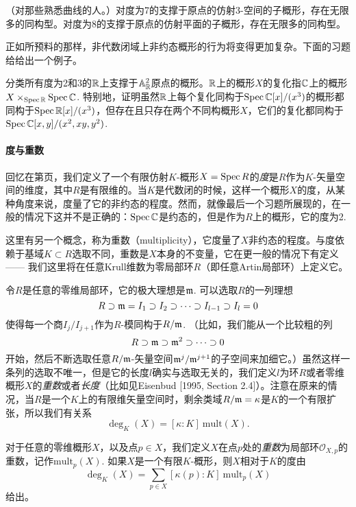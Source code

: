 \begin{exe}
	（对那些熟悉曲线的人。）对度为7的支撑于原点的仿射$3$\hyp 空间的子概形，存在无限多的同构型。对度为8的支撑于原点的仿射平面的子概形，存在无限多的同构型。
\end{exe}

正如所预料的那样，非代数闭域上非约态概形的行为将变得更加复杂。下面的习题给给出一个例子。

\begin{exe}
	分类所有度为2和3的$\mathbb{R}$上支撑于$\mathbb{A}_{\mathbb{R}}^2$原点的概形。$\mathbb{R}$上的概形$X$的复化指$\mathbb{C}$上的概形$X\times_{\operatorname{Spec} \mathbb{R}}\operatorname{Spec} \mathbb{C}$. 特别地，证明虽然$\mathbb{R}$上每个复化同构于$\operatorname{Spec} \mathbb{C}[x]/(x^3)$的概形都同构于$\operatorname{Spec} \mathbb{R}[x]/(x^3)$，但存在且只存在两个不同构概形$X$，它们的复化都同构于$\operatorname{Spec} \mathbb{C}[x,y]/(x^2,xy,y^2)$.
\end{exe}

\paragraph*{度与重数}
回忆在第\pageref{deg}页，我们定义了一个有限仿射$K$\hyp 概形$X=\operatorname{Spec} R$的\textit{度}是$R$作为$K$\hyp 矢量空间的维度，其中$R$是有限维的。当$K$是代数闭的时候，这样一个概形$X$的度，从某种角度来说，度量了它的非约态的程度。然而，就像最后一个习题所展现的，在一般的情况下这并不是正确的：$\operatorname{Spec} \mathbb{C}$是约态的，但是作为$R$上的概形，它的度为2.

这里有另一个概念，称为重数（multiplicity），它度量了$X$非约态的程度。与度依赖于基域$K\subset R$选取不同，重数是$X$本身的不变量，它在更一般的情况下有定义 ------ 我们这里将在任意Krull维数为零局部环$R$（即任意Artin局部环）上定义它。

令$R$是任意的零维局部环，它的极大理想是$\mathfrak{m}$. 可以选取$R$的一列理想
\[
	R\supset \mathfrak{m} = I_1\supset I_2\supset \cdots \supset I_{l-1}\supset I_l=0
\]
使得每一个商$I_j/I_{j+1}$作为$R$\hyp 模同构于$R/\mathfrak{m}$. （比如，我们能从一个比较粗的列
\[
	R\supset \mathfrak{m} \supset \mathfrak{m}^2\supset \cdots \supset 0
\]
开始，然后不断选取任意$R/\mathfrak{m}$\hyp 矢量空间$\mathfrak{m}^j/\mathfrak{m}^{j+1}$的子空间来加细它。）虽然这样一条列的选取不唯一，但是它的长度$l$确实与选取无关的，我们定义$l$为环$R$或者零维概形$X$的\textit{重数}或者\textit{长度}（比如见Eisenbud [1995, Section 2.4]）。注意在原来的情况，当$R$是一个$K$上的有限维矢量空间时，剩余类域$R/\mathfrak{m}=\kappa$是$K$的一个有限扩张，所以我们有关系
\[
	\deg_K(X)=[\kappa:K]~\mathrm{mult}(X).
\]

对于任意的零维概形$X$，以及点$p\in X$，我们定义$X$在点$p$处的\textit{重数}为局部环$\mathscr{O}_{X,p}$的重数，记作$\mathrm{mult}_p(X)$. 如果$X$是一个有限$K$\hyp 概形，则$X$相对于$K$的度由
\[
	\deg_K(X)=\sum_{p\in X}[\kappa(p):K]~\mathrm{mult}_p(X)
\]
给出。

